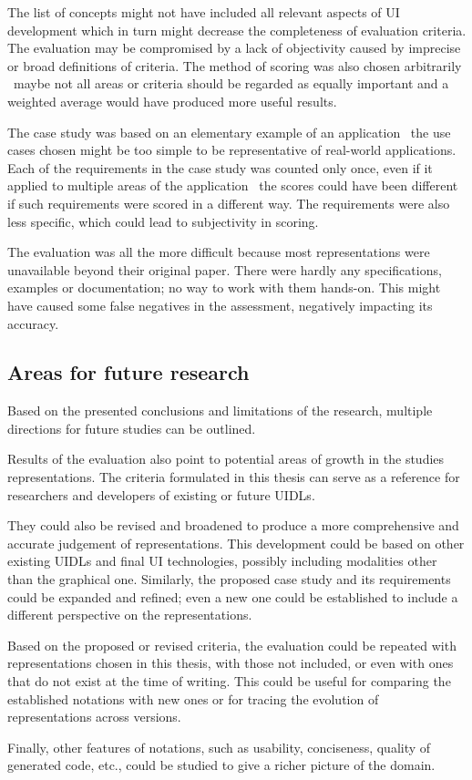 The list of concepts might not have included all relevant aspects of UI development which in turn might decrease the completeness of evaluation criteria.
The evaluation may be compromised by a lack of objectivity caused by imprecise or broad definitions of criteria.
The method of scoring was also chosen arbitrarily \textendash\ maybe not all areas or criteria should be regarded as equally important and a weighted average would have produced more useful results.

The case study was based on an elementary example of an application \textendash\ the use cases chosen might be too simple to be representative of real-world applications.
Each of the requirements in the case study was counted only once, even if it applied to multiple areas of the application \textendash\ the scores could have been different if such requirements were scored in a different way.
The requirements were also less specific, which could lead to subjectivity in scoring.

The evaluation was all the more difficult because most representations were unavailable beyond their original paper.
There were hardly any specifications, examples or documentation; no way to work with them hands-on.
This might have caused some false negatives in the assessment, negatively impacting its accuracy.

\subsection{Areas for future research}\label{subsec:areas-for-future-research}

Based on the presented conclusions and limitations of the research, multiple directions for future studies can be outlined.

Results of the evaluation also point to potential areas of growth in the studies representations.
The criteria formulated in this thesis can serve as a reference for researchers and developers of existing or future UIDLs.

They could also be revised and broadened to produce a more comprehensive and accurate judgement of representations.
This development could be based on other existing UIDLs and final UI technologies, possibly including modalities other than the graphical one.
Similarly, the proposed case study and its requirements could be expanded and refined; even a new one could be established to include a different perspective on the representations.

Based on the proposed or revised criteria, the evaluation could be repeated with representations chosen in this thesis, with those not included, or even with ones that do not exist at the time of writing.
This could be useful for comparing the established notations with new ones or for tracing the evolution of representations across versions.

Finally, other features of notations, such as usability, conciseness, quality of generated code, etc., could be studied to give a richer picture of the domain.
